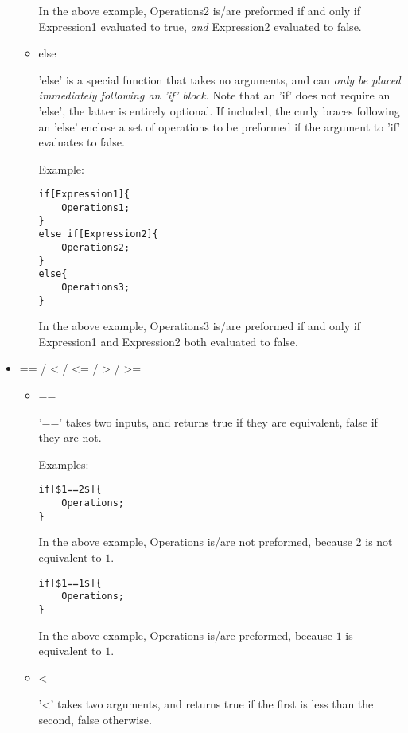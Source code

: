 \begin{itemize}
\begin{itemize}
\begin{center}
In the above example, Operations2 is/are preformed if and only if Expression1 evaluated to true, \emph{and} Expression2 evaluated to false.
\end{center}
\item else\\
\begin{center}
'else' is a special function that takes no arguments, and can \emph{only be placed immediately following an 'if' block}. Note that an 'if' does not require an 'else', the latter is entirely optional. If included, the curly braces following an 'else' enclose a set of operations to be preformed if the argument to 'if' evaluates to false.
\end{center}
Example:\\
\begin{verbatim}
if[Expression1]{
	Operations1;
}
else if[Expression2]{
	Operations2;
}
else{
	Operations3;
}
\end{verbatim}
\begin{center}
In the above example, Operations3 is/are preformed if and only if Expression1 and Expression2 both evaluated to false.
\end{center}
\end{itemize}
\item == / < / <= / > / >=
\begin{itemize}
\item ==
\begin{center}
'==' takes two inputs, and returns true if they are equivalent, false if they are not.
\end{center}
Examples:
\begin{verbatim}
if[$1==2$]{
	Operations;
}
\end{verbatim}
\begin{center}
In the above example, Operations is/are not preformed, because $2$ is not equivalent to $1$.
\end{center}
\begin{verbatim}
if[$1==1$]{
	Operations;
}
\end{verbatim}
\begin{center}
In the above example, Operations is/are preformed, because $1$ is equivalent to $1$.
\end{center}
\item < \\
\begin{center}
'<' takes two arguments, and returns true if the first is less than the second, false otherwise.
\end{center}

\end{itemize}
\end{itemize}
